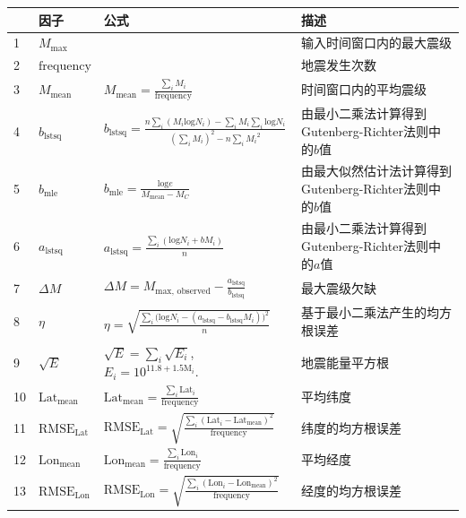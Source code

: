 \begin{table}
  \centering
  \label{tab:seism_input_data}
  \footnotesize
  \begin{tabular}{llll}
    \toprule
      & 因子 & 公式 & 描述 \\
    \midrule
    1 & $M_{\text{max}}$ &  & 输入时间窗口内的最大震级 \\ 
    2 & $\text{frequency}$ &  & 地震发生次数 \\ 
    3 & $M_{\text{mean}}$ & $\displaystyle M_{\text{mean}}=\frac{\sum_i{M_i}}{\text{frequency}}$ & 时间窗口内的平均震级 \\ 
    4 & $b_{\text{lstsq}}$ & $\displaystyle b_{\text{lstsq}}=\frac{n\sum_i{(M_i\text{log} N_i)}-\sum_i{M_i}\sum_i\text{log}N_i}{(\sum_i{M_i})^2-n\sum_i{{M_i}^2}}$ & 由最小二乘法计算得到Gutenberg-Richter法则中的$b$值\\
    5 & $b_{\text{mle}}$ & $\displaystyle b_{\text{mle}}=\frac{\text{log}e}{M_{\text{mean}}-M_C}$ & 由最大似然估计法计算得到Gutenberg-Richter法则中的$b$值 \\ 
    6 & $a_{\text{lstsq}}$ & $\displaystyle a_{\text{lstsq}}=\frac{\sum_i{(\text{log}N_i+bM_i)}}{n}$ & 由最小二乘法计算得到Gutenberg-Richter法则中的$a$值 \\ 
    7 & $\Delta M$ & $\displaystyle \Delta M=M_{\text{max, observed}}- \frac{a_{\text{lstsq}}}{b_{\text{lstsq}}}$ & 最大震级欠缺 \\ 
    8 & $\eta$ & $\displaystyle \eta=\sqrt{\frac{\sum_i{(\text{log} {N_i}}-(a_{\text{lstsq}}-b_{\text{lstsq}}{M_i}))^2}{n}}$ & 基于最小二乘法产生的均方根误差 \\ 
    9 & $\sqrt{E}$ & $\displaystyle \sqrt{E}=\sum_i{\sqrt{E_i}}$, $\displaystyle E_i=10^{11.8+1.5\text{M}_i}.$ & 地震能量平方根\citep{Last2016predicting,asim2017earthquake}  \\ 
    10 & $\text{Lat}_{\text{mean}}$ & $\displaystyle \text{Lat}_{\text{mean}}=\frac{\sum_i{\text{Lat}_i}}{\text{frequency}}$ & 平均纬度 \\ 
    11 & $\text{RMSE}_{\text{Lat}}$ & $\displaystyle \text{RMSE}_{\text{Lat}}=\sqrt{\frac{\sum_i{(\text{Lat}_i-\text{Lat}_\text{mean})}^2}{\text{frequency}}}$ & 纬度的均方根误差 \\ 
    12 & $\text{Lon}_{\text{mean}}$ & $\displaystyle \text{Lon}_{\text{mean}}=\frac{\sum_i{\text{Lon}_i}}{\text{frequency}}$ & 平均经度\\ 
    13 & $\text{RMSE}_{\text{Lon}}$ & $\displaystyle \text{RMSE}_{\text{Lon}}=\sqrt{\frac{\sum_i{(\text{Lon}_i-\text{Lon}_\text{mean})}^2}{\text{frequency}}}$ &  经度的均方根误差 \\ 

\end{tabular}
\end{table}
